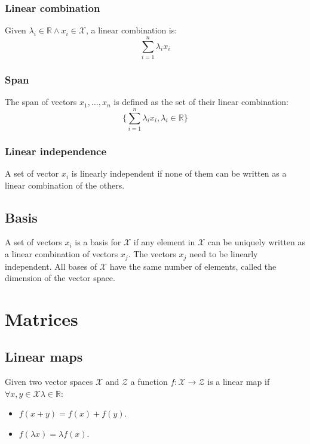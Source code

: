 		\subsubsection{Linear combination}
		Given $\lambda_i\in\mathbb{R}\land x_i\in\mathcal{X}$, a linear combination is:
		$$\sum\limits_{i=1}^n\lambda_i x_i$$

		\subsubsection{Span}
		The span of vectors $x_1, \dots, x_n$ is defined as the set of their linear combination:
		$$\bigl\{\sum\limits_{i=1}^n\lambda_ix_i, \lambda_i\in\mathbb{R}\bigr\}$$

		\subsubsection{Linear independence}
		A set of vector $x_i$ is linearly independent if none of them can be written as a linear combination of the others.

	\subsection{Basis}
	A set of vectors $x_i$ is a basis for $\mathcal{X}$ if any element in $\mathcal{X}$ can be uniquely written as a linear combination of vectors $x_j$.
	The vectors $x_j$ need to be linearly independent.
	All bases of $\mathcal{X}$ have the same number of elements, called the dimension of the vector space.

\section{Matrices}

	\subsection{Linear maps}
	Given two vector spaces $\mathcal{X}$ and $\mathcal{Z}$ a function $f:\mathcal{X}\rightarrow\mathcal{Z}$ is a linear map if $\forall x, y\in\mathcal{X}\lambda\in\mathbb{R}$:
	\begin{multicols}{2}
		\begin{itemize}
			\item $f(x + y) = f(x) + f(y)$.
			\item $f(\lambda x) = \lambda f(x)$.
		\end{itemize}
	\end{multicols}

